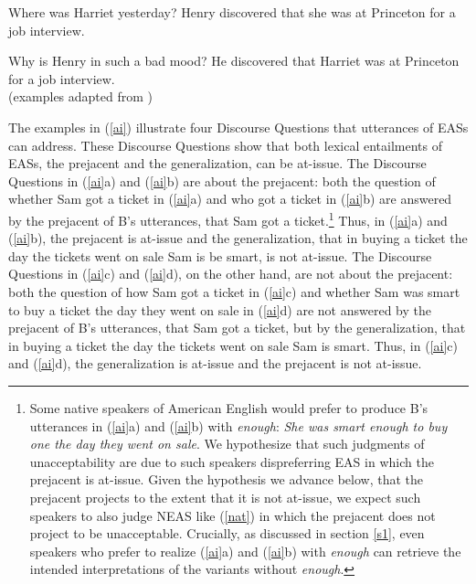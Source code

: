 \documentclass[11pt,fleqn]{article}
\newcommand{\6}{\mbox{$[\hspace*{-.6mm}[$}}
\newcommand{\9}{\mbox{$]\hspace*{-.6mm}]$}}
\begin{document}
\begin{exe}
\ex\label{discover2}
\begin{xlist}
\ex
\begin{xlist}
 Where was Harriet yesterday?
 Henry discovered that she was at Princeton for a job interview.
\end{xlist}

\ex
\begin{xlist}
 Why is Henry in such a bad mood?
 He discovered that Harriet was at Princeton for a job interview.
\\ \hspace*{.2cm} \hfill (examples adapted from \citealt[1035]{simons07})
\end{xlist}

\end{xlist}
\end{exe}

The examples in (\ref{ai}) illustrate four Discourse Questions that utterances of EASs can address. These Discourse Questions show that both lexical entailments of EASs, the prejacent and the generalization, can be at-issue. The Discourse Questions in (\ref{ai}a) and (\ref{ai}b) are about the prejacent: both the question of whether Sam got a ticket in (\ref{ai}a) and who got a ticket in (\ref{ai}b) are answered by the prejacent of B's utterances, that Sam got a ticket.\footnote{Some native speakers of American English would prefer to produce B's utterances in (\ref{ai}a) and (\ref{ai}b) with {\em enough}: {\em She was smart enough to buy one the day they went on sale}. We hypothesize that such judgments of unacceptability are due to such speakers dispreferring EAS in which the prejacent is at-issue. Given the hypothesis we advance below, that the prejacent projects to the extent that it is not at-issue, we expect such speakers to also judge NEAS like (\ref{nat}) in which the prejacent does not project to be unacceptable. Crucially, as discussed in section \ref{s1}, even speakers who prefer to realize (\ref{ai}a) and (\ref{ai}b) with {\em enough} can retrieve the intended interpretations of the variants without {\em enough}.} Thus, in (\ref{ai}a) and (\ref{ai}b), the prejacent is at-issue and the generalization, that in buying a ticket the day the tickets went on sale Sam is be smart, is not at-issue. The Discourse Questions in (\ref{ai}c) and (\ref{ai}d), on the other hand, are not about the prejacent:  both the question of how Sam got a ticket in (\ref{ai}c) and whether Sam was smart to buy a ticket the day they went on sale in (\ref{ai}d) are not answered by the prejacent of B's utterances, that Sam got a ticket, but by the generalization, that in buying a ticket the day the tickets went on sale Sam is smart. Thus, in (\ref{ai}c) and (\ref{ai}d), the generalization is at-issue and the prejacent is not at-issue.
\end{document}
